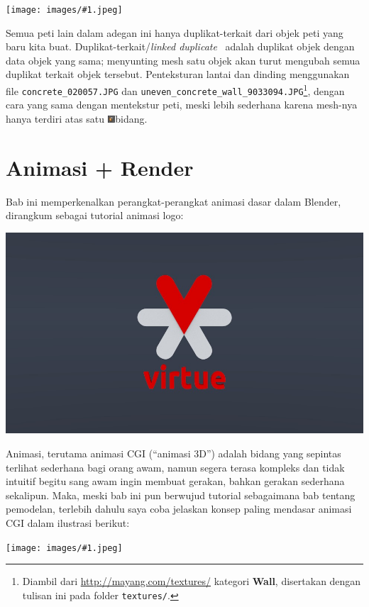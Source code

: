\documentclass[11pt]{report}
\def\picscale{.37}
\newcommand{\fig}[1]{
  \begingroup
  \centering
  \texttt{[image: images/\#1.jpeg]}
  \label{fig:#1}
  \endgroup
}
\def\meshSelFace{\includegraphics[height=10px,bb=0 0 25 25]{icons/meshSelFace.jpeg}bidang}
\def\key#1{\fbox{\bfseries\ttfamily#1}}
\begin{document}
\fig{final}

Semua peti lain dalam adegan ini hanya duplikat-terkait dari objek peti yang baru kita buat. Duplikat-terkait/\textsl{linked duplicate}~\key{Alt-D} adalah duplikat objek dengan data objek yang sama; menyunting mesh satu objek akan turut mengubah semua duplikat terkait objek tersebut. Penteksturan lantai dan dinding menggunakan file \texttt{concrete\_020057.JPG} dan \texttt{uneven\_concrete\_wall\_9033094.JPG}\footnote{Diambil dari \url{http://mayang.com/textures/} kategori \textbf{Wall}, disertakan dengan tulisan ini pada folder \texttt{textures/}.}, dengan cara yang sama dengan mentekstur peti, meski lebih sederhana karena mesh-nya hanya terdiri atas satu \meshSelFace.

\chapter{Animasi + Render}

Bab ini memperkenalkan perangkat-perangkat animasi dasar dalam Blender, dirangkum sebagai tutorial animasi logo:

{\centering{}\includegraphics[scale=\picscale, bb=0 0 960 540]{images/logo.jpeg}\\}

Animasi, terutama animasi CGI (``animasi 3D'') adalah bidang yang sepintas terlihat sederhana bagi orang awam, namun segera terasa kompleks dan tidak intuitif begitu sang awam ingin membuat gerakan, bahkan gerakan sederhana sekalipun. Maka, meski bab ini pun berwujud tutorial sebagaimana bab tentang pemodelan, terlebih dahulu saya coba jelaskan konsep paling mendasar animasi CGI dalam ilustrasi berikut:

\fig{anim-000}
\end{document}
